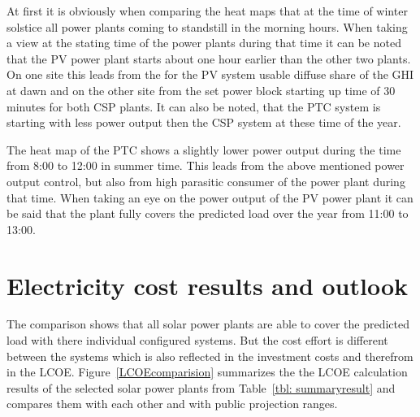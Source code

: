 At first it is obviously when comparing the heat maps that at the time of winter solstice all power plants coming to standstill in the morning hours. When taking a view at the stating time of the power plants during that time it can be noted that the PV power plant starts about one hour earlier than the other two plants. On one site this leads from the for the PV system usable diffuse share of the GHI at dawn and on the other site from the set power block starting up time of 30 minutes for both CSP plants. It can also be noted, that the PTC system is starting with less power output then the CSP system at these time of the year.

The heat map of the PTC shows a slightly lower power output during the time from 8:00 to 12:00 in summer time. This leads from the above mentioned power output control, but also from high parasitic consumer of the power plant during that time. When taking an eye on the power output of the PV power plant it can be said that the plant fully covers the predicted load over the year from 11:00 to 13:00.

\section{Electricity cost results and outlook}
The comparison shows that all solar power plants are able to cover the predicted load with there individual configured systems. But the cost effort is different between the systems which is also reflected in the investment costs and therefrom in the LCOE. Figure~\ref{LCOEcomparision} summarizes the the LCOE calculation results of the selected solar power plants from Table~\ref{tbl: summaryresult} and compares them with each other and with public projection ranges. 

